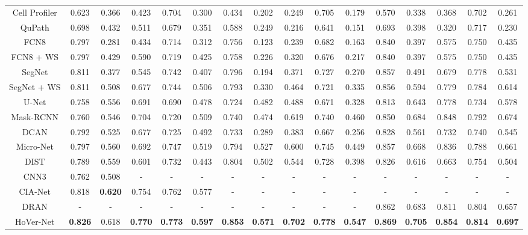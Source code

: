 \documentclass[journal]{IEEEtran}
\begin{document}
\begin{table*}[t]
\begin{center}
{\begin{tabular}{c|ccccc|ccccc|ccccc}
					
Cell Profiler \cite{carpenter2006cellprofiler}   & 0.623 & 0.366 & 0.423 & 0.704 & 0.300 & 0.434 & 0.202 & 0.249 & 0.705 & 0.179 &    0.570 & 0.338 & 0.368 & 0.702 & 0.261 \\ 
					QuPath \cite{bankhead2017qupath}    & 0.698 & 0.432 & 0.511 & 0.679 & 0.351 & 0.588 & 0.249 & 0.216 & 0.641 & 0.151 & 0.693 & 0.398 & 0.320 & 0.717 & 0.230 \\ 
					FCN8 \cite{long2015fully}        & 0.797 & 0.281 & 0.434 & 0.714 & 0.312 & 0.756 & 0.123 & 0.239 & 0.682 & 0.163 & 0.840 & 0.397 & 0.575 & 0.750 & 0.435 \\ 					
					FCN8 + WS \cite{long2015fully}   & 0.797 & 0.429 & 0.590 & 0.719 & 0.425 & 0.758 & 0.226 & 0.320 & 0.676 & 0.217 & 0.840 & 0.397 & 0.575 & 0.750 & 0.435  \\ 
					SegNet \cite{badrinarayanan2017segnet}      & 0.811 & 0.377 & 0.545 & 0.742 & 0.407 & 0.796 & 0.194 & 0.371 & 0.727 & 0.270 &    0.857 & 0.491 & 0.679 & 0.778 & 0.531 \\ 
					SegNet + WS \cite{badrinarayanan2017segnet}  & 0.811 & 0.508 & 0.677 & 0.744 & 0.506 & 0.793 & 0.330 & 0.464 & 0.721 & 0.335 & 0.856 & 0.594 & 0.779 & 0.784 & 0.614 \\ 
					U-Net \cite{ronneberger2015u}  & 0.758 & 0.556 & 0.691 & 0.690 & 0.478  &  0.724 & 0.482 & 0.488 & 0.671 & 0.328 &   0.813 & 0.643 & 0.778 & 0.734 & 0.578 \\ 
					Mask-RCNN \cite{mrcnn}  & 0.760 & 0.546 & 0.704 & 0.720 & 0.509 & 0.740 & 0.474 & 0.619 & 0.740 & 0.460 &    0.850 & 0.684 & 0.848 & 0.792 & 0.674  \\ 
DCAN \cite{chen2016dcan}       & 0.792 & 0.525 & 0.677 & 0.725 & 0.492 & 0.733 & 0.289 & 0.383 & 0.667 & 0.256 &    0.828 & 0.561 & 0.732 & 0.740 & 0.545 \\ 
					Micro-Net \cite{micronet2018Shan}  & 0.797 & 0.560 & 0.692 & 0.747 & 0.519 & 0.794 & 0.527 & 0.600 & 0.745 & 0.449 & 0.857 & 0.668 & 0.836 & 0.788 & 0.661 \\
					DIST \cite{naylor2018segmentation}    & 0.789 & 0.559 & 0.601 & 0.732 & 0.443  & 0.804 & 0.502 & 0.544 & 0.728 & 0.398 &    0.826 & 0.616 & 0.663 & 0.754 & 0.504 \\
					CNN3 \cite{kumar}    & 0.762 & 0.508 & - & - & -  & - & - & - & - & - &    - & - & - & - & - \\
					\midrule
					CIA-Net \cite{zhou2019cia}    & 0.818 & \textbf{0.620} & 0.754 & 0.762 & 0.577  & - & - & - & - & - & - & - & - & - & - \\
					DRAN \cite{vu2018methods}      & - & - & - & - & -  & - & - & - & - & - &  0.862 & 0.683 & 0.811 & 0.804 & 0.657 \\ 
					\midrule
					HoVer-Net       & \textbf{0.826} & 0.618 & \textbf{0.770} & \textbf{0.773} & \textbf{0.597} & \textbf{0.853} & \textbf{0.571} & \textbf{0.702} & \textbf{0.778} & \textbf{0.547} & \textbf{0.869} & \textbf{0.705} & \textbf{0.854} & \textbf{0.814} & \textbf{0.697} \\ 
				

\end{tabular}}
\end{center}
\end{table*}
\end{document}
